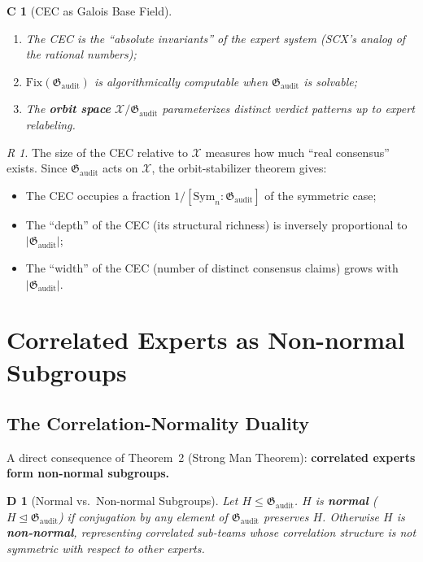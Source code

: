 \documentclass[12pt,a4paper]{article}
\newtheorem{corollary}[theorem]Corollary
\newtheorem{definition}[theorem]Definition
\theoremstyle{remark}
\newtheorem{remark}[theorem]Remark
\newcommand{\Fix}{\mathrm{Fix}}
\newcommand{\Sym}{\mathrm{Sym}}
\newcommand{\Normal}{\trianglelefteq}
\newcommand{\AuditGrp}{\mathfrak{G}_{\mathrm{audit}}}
\newcommand{\ClaimSpace}{\mathcal{X}}
\begin{document}
\begin{corollary}[CEC as Galois Base Field]
\begin{enumerate}[label=(\arabic*),itemsep=3pt]
    \item The CEC is the ``absolute invariants'' of the expert system (SCX's analog of the rational numbers);
    \item \(\Fix(\AuditGrp)\) is algorithmically computable when \(\AuditGrp\) is solvable;
    \item The \textbf{orbit space} \(\ClaimSpace / \AuditGrp\) parameterizes distinct verdict patterns up to expert relabeling.
\end{enumerate}
\end{corollary}
\begin{remark}
The size of the CEC relative to \(\ClaimSpace\) measures how much ``real consensus'' exists. Since \(\AuditGrp\) acts on \(\ClaimSpace\), the orbit-stabilizer theorem gives:
\begin{itemize}
    \item The CEC occupies a fraction \(1 / [\Sym_n : \AuditGrp]\) of the symmetric case;
    \item The ``depth'' of the CEC (its structural richness) is inversely proportional to \(|\AuditGrp|\);
    \item The ``width'' of the CEC (number of distinct consensus claims) grows with \(|\AuditGrp|\).
\end{itemize}
\end{remark}
\section{Correlated Experts as Non-normal Subgroups}
\subsection{The Correlation-Normality Duality}
A direct consequence of Theorem~2 (Strong Man Theorem): \textbf{correlated experts form non-normal subgroups.}

\begin{definition}[Normal vs.\ Non-normal Subgroups]
Let \(H \leq \AuditGrp\). \(H\) is \textbf{normal} (\(H \Normal \AuditGrp\)) if conjugation by any element of \(\AuditGrp\) preserves \(H\). Otherwise \(H\) is \textbf{non-normal}, representing correlated sub-teams whose correlation structure is not symmetric with respect to other experts.
\end{definition}
\end{document}
